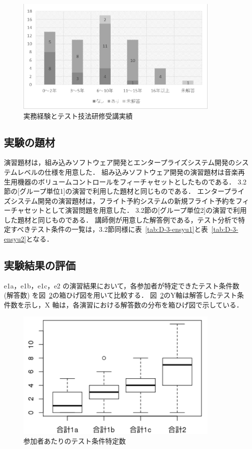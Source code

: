 \begin{figure}[H]
\begin{center}
\includegraphics[width=10cm]{./image/D-3-Fig7b.png}
\caption{実務経験とテスト技法研修受講実績}
\label{fig:D-3-Fig7b}
\end{center}
\end{figure}



\subsection{実験の題材}
演習題材は，組み込みソフトウェア開発とエンタープライズシステム開発のシステムレベルの仕様を用意した．
組み込みソフトウェア開発の演習題材は音楽再生用機器のボリュームコントロールをフィーチャセットとしたものである．
3.2節の[グループ単位1]の演習で利用した題材と同じものである．
エンタープライズシステム開発の演習題材は，フライト予約システムの新規フライト予約をフィーチャセットとして演習問題を用意した．
3.2節の[グループ単位2]の演習で利用した題材と同じものである．
講師側が用意した解答例である，テスト分析で特定すべきテスト条件の一覧は，3.2節同様に表~\ref{tab:D-3-ensyu1}と表~\ref{tab:D-3-ensyu2}となる．


\subsection{実験結果の評価} \label{sec:3-2}
e1a，e1b，e1c，e2 の演習結果において，各参加者が特定できたテスト条件数 (解答数) を図~\ref{fig:D-3-Fig10}の箱ひげ図を用いて比較する．
図~\ref{fig:D-3-Fig10}のY軸は解答したテスト条件数を示し，X 軸は，各演習における解答数の分布を箱ひげ図で示している．

\begin{figure}[htbp]
  \begin{center}
  \includegraphics[width=10cm]{./image/D-3-Fig10.png}
  \caption{参加者あたりのテスト条件特定数}
  \label{fig:D-3-Fig10}
  \end{center}
\end{figure}

